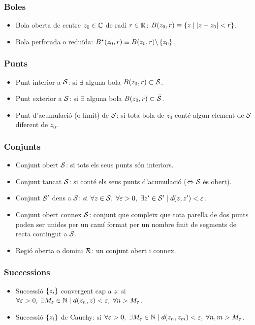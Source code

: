 \subsubsection*{Boles}
\begin{itemize}    
    \item Bola oberta de centre $z_{0} \in \mathbb{C}$ de radi $r \in \mathbb{R}$: $B(z_{0}, r) \equiv \left\{ z \mid \left| z - z_{0} \right| < r \right\}$.
    \item Bola perforada o reduïda: $B^{\star}(z_{0}, r) \equiv B(z_{0}, r)\backslash \left\{ z_{0} \right\}$.
\end{itemize}

\subsubsection*{Punts}
\begin{itemize}
    \item Punt interior a $\mathcal{S}$: si $\exists$ alguna bola $B(z_{0}, r) \subset \mathcal{S}$.
    \item Punt exterior a $\mathcal{S}$: si $\exists$ alguna bola $B(z_{0}, r) \subset \bar{\mathcal{S}}$.
    \item Punt d'acumulació (o límit) de $\mathcal{S}$: si tota bola de $z_{0}$ conté algun element de $\mathcal{S}$ diferent de $z_{0}$.
\end{itemize}

\subsubsection*{Conjunts}
\begin{itemize}
    \item Conjunt obert $\mathcal{S}$: si tots els seus punts són interiors.
    \item Conjunt tancat $\mathcal{S}$: si conté els seus punts d'acumulació ($\Leftrightarrow \bar{\mathcal{S}}$ és obert).
    \item Conjunt $\mathcal{S}'$ dens a $\mathcal{S}$: si $\forall z \in \mathcal{S}, \; \forall \varepsilon > 0, \; \exists z' \in \mathcal{S}' \mid d(z,z') < \varepsilon$.
    \item Conjunt obert connex $\mathcal{S}$: conjunt que compleix que tota parella de dos punts poden ser unides per un camí format per un nombre finit de segments de recta contingut a $\mathcal{S}$.
    \item Regió oberta o domini $\mathcal{R}$: un conjunt obert i connex.
\end{itemize}

\subsubsection*{Successions}
\begin{itemize}
    \item Successió $\left\{ z_{i} \right\}$ convergent cap a $z$: si $\forall \varepsilon > 0, \; \exists M_{\varepsilon} \in \mathbb{N} \mid d(z_{n}, z) < \varepsilon, \; \forall n > M_{\varepsilon}$.
    \item Successió $\left\{ z_{i} \right\}$ de Cauchy: si $\forall \varepsilon > 0, \; \exists M_{\varepsilon} \in \mathbb{N} \mid d(z_{n}, z_{m}) < \varepsilon, \; \forall n, m > M_{\varepsilon}$.
\end{itemize}
